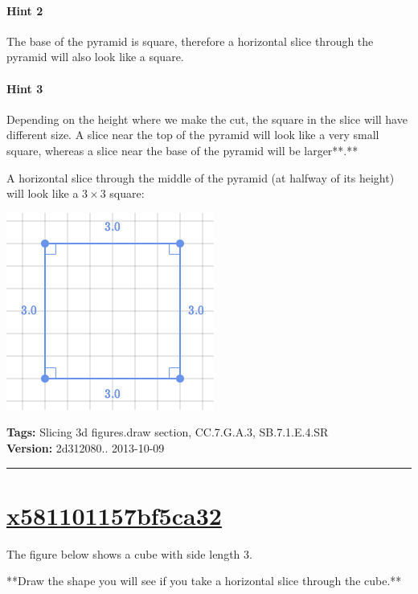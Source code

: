 \documentclass[twocolumn,10pt]{article}
\def\shrinkfactor{0.4}
\begin{document}
\paragraph{Hint 2}The base of the pyramid is square,
therefore a horizontal slice through the pyramid will also look like a square.

\paragraph{Hint 3}Depending on the height where we make the cut, the square in the slice will have different size. A slice near the top of the pyramid will look like a very small square, whereas a slice near the base of the pyramid will be larger**.**

A horizontal slice through the middle of the pyramid (at halfway of its height) will look like a $3 \times 3$ square:    

\includegraphics[scale=\shrinkfactor]{figures/339319c697846538f4f62770f5fc3cc189f26e88.png}



\medskip
\noindent
\textbf{Tags:} {\footnotesize Slicing 3d figures.draw section, CC.7.G.A.3, SB.7.1.E.4.SR}\\
\textbf{Version:} 2d312080.. 2013-10-09
\smallskip\hrule





\section{\href{https://www.khanacademy.org/devadmin/content/items/x581101157bf5ca32}{x581101157bf5ca32}}

\noindent
The figure below shows a cube with side length $3$.   

**Draw the shape you will see if you take a horizontal slice through the cube.**
\end{document}
